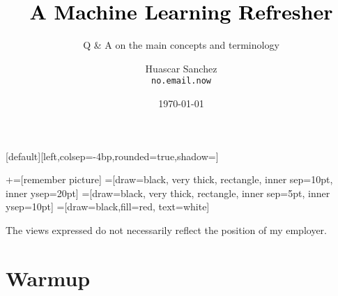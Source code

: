 

\usepackage{framed}
\usepackage[inline]{enumitem}
\usepackage[backend=bibtex]{biblatex}
\usepackage{amssymb}

\newcommand{\norm}[1]{\left\lVert #1 \right\rVert}

\title[]{\Huge \textbf{\textcolor{black}{A Machine Learning Refresher}}}
\subtitle{\Large Q \& A on the main concepts and terminology}
\author[HAS]{
\parbox[t]{1.5in}{Huascar Sanchez \\\small\texttt{no.email.now}} %
}

\date{\today}

\makeatletter
{}[default][left,colsep=-4bp,rounded=true,shadow=\beamer@themerounded@shadow]
\makeatother


\newcommand\marktopleft[1]{%
    \tikz[overlay,remember picture]
        \node (marker-#1-a) at (-.3em,.3em) {};%
}
\newcommand\markbottomright[2]{%
    \tikz[overlay,remember picture]
        \node (marker-#1-b) at (0em,0em) {};%
}
+=[remember picture]
 =[draw=black, very thick, rectangle, inner sep=10pt, inner ysep=20pt]
 =[draw=black, very thick, rectangle, inner sep=5pt, inner ysep=10pt]
 =[draw=black,fill=red, text=white]

\begin{frame}
\maketitle
\tiny\hspace{1em}The views expressed do not necessarily reflect the position of my employer.
\end{frame}

\section{Warmup}

